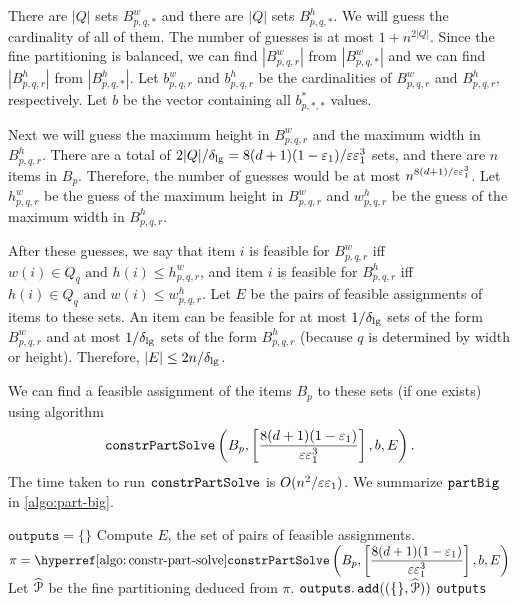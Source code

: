 There are $|Q|$ sets $B^w_{p,q,*}$ and there are $|Q|$ sets $B^h_{p,q,*}$.
We will guess the cardinality of all of them.
The number of guesses is at most $1 + n^{2|Q|}$.
Since the fine partitioning is balanced,
we can find $|B^w_{p,q,r}|$ from $|B^w_{p,q,*}|$
and we can find $|B^h_{p,q,r}|$ from $|B^h_{p,q,*}|$.
Let $b^w_{p,q,r}$ and $b^h_{p,q,r}$ be the cardinalities of
$B^w_{p,q,r}$ and $B^h_{p,q,r}$, respectively.
Let $b$ be the vector containing all $b^{*}_{p,*,*}$ values.

Next we will guess the maximum height in $B^w_{p,q,r}$ and the maximum width in $B^h_{p,q,r}$.
There are a total of $2|Q|/\delta_{\mathrm{lg}} = 8(d+1)(1-\varepsilon_1)/\varepsilon\varepsilon_1^3$ sets,
and there are $n$ items in $B_p$.
Therefore, the number of guesses would be at most ${\displaystyle n^{8(d+1)/\varepsilon\varepsilon_1^3}}$.
Let $h^w_{p,q,r}$ be the guess of the maximum height in $B^w_{p,q,r}$
and $w^h_{p,q,r}$ be the guess of the maximum width in $B^h_{p,q,r}$.

After these guesses, we say that item $i$ is feasible for $B^w_{p,q,r}$ iff
$w(i) \in Q_q \textrm{ and } h(i) \le h^w_{p,q,r}$,
and item $i$ is feasible for $B^h_{p,q,r}$ iff
$h(i) \in Q_q \textrm{ and } w(i) \le w^h_{p,q,r}$.
Let $E$ be the pairs of feasible assignments of items to these sets.
An item can be feasible for at most $1/\delta_{\mathrm{lg}}$ sets of the form $B^w_{p,q,r}$
and at most $1/\delta_{\mathrm{lg}}$ sets of the form $B^h_{p,q,r}$
(because $q$ is determined by width or height).
Therefore, $|E| \le 2n/\delta_{\mathrm{lg}}$.

We can find a feasible assignment of the items $B_p$ to these sets (if one exists) using algorithm
\[ \operatorname{\mathtt{constrPartSolve}}\left(B_p, \left[ \frac{8(d+1)(1-\varepsilon_1)}{\varepsilon\varepsilon_1^3} \right],
    b, E\right). \]
The time taken to run $\operatorname{\mathtt{constrPartSolve}}$ is $O(n^2/\varepsilon\varepsilon_1)$.
We summarize $\operatorname{\mathtt{partBig}}$ in \cref{algo:part-big}.

\begin{algorithm}[htb]
\caption{$\partBig(B_p)$:}
\label{algo:part-big}
\begin{algorithmic}[1]
\State $\texttt{outputs} = \{\}$
        \State Compute $E$, the set of pairs of feasible assignments.
        \State $\pi = {\displaystyle \constrPartSolveHyp\left(B_p,
            \left[ \frac{8(d+1)(1-\epsLarge)}{\eps\epsLarge^3} \right], b, E\right) }$
            \State Let $\widehat{\mathcal{P}}$ be the fine partitioning deduced from $\pi$.
            \State $\operatorname{\mathtt{outputs.add}}((\{\}, \widehat{\mathcal{P}}))$
        \EndIf
    \EndFor
\EndFor
\State \Return \texttt{outputs}
\end{algorithmic}
\end{algorithm}

